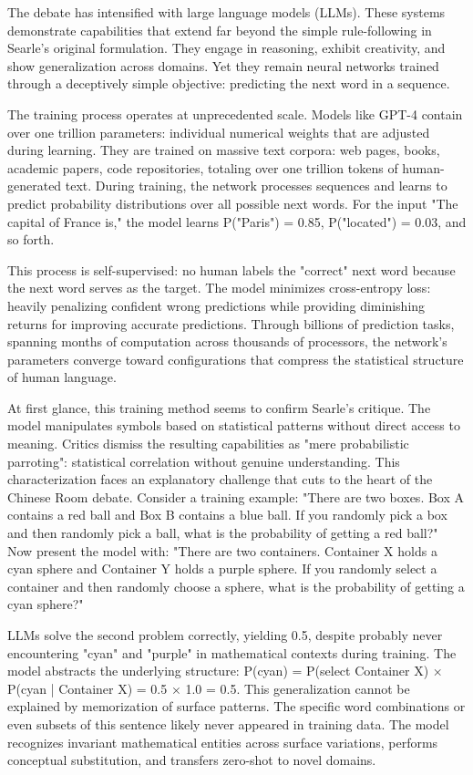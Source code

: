 The debate has intensified with large language models (LLMs). These systems demonstrate capabilities that extend far beyond the simple rule-following in Searle's original formulation. They engage in reasoning, exhibit creativity, and show generalization across domains. Yet they remain neural networks trained through a deceptively simple objective: predicting the next word in a sequence.

The training process operates at unprecedented scale. Models like GPT-4 contain over one trillion parameters: individual numerical weights that are adjusted during learning. They are trained on massive text corpora: web pages, books, academic papers, code repositories, totaling over one trillion tokens of human-generated text. During training, the network processes sequences and learns to predict probability distributions over all possible next words. For the input "The capital of France is," the model learns P("Paris") = 0.85, P("located") = 0.03, and so forth.

This process is self-supervised: no human labels the "correct" next word because the next word serves as the target. The model minimizes cross-entropy loss: heavily penalizing confident wrong predictions while providing diminishing returns for improving accurate predictions. Through billions of prediction tasks, spanning months of computation across thousands of processors, the network's parameters converge toward configurations that compress the statistical structure of human language.

At first glance, this training method seems to confirm Searle's critique. The model manipulates symbols based on statistical patterns without direct access to meaning. Critics dismiss the resulting capabilities as "mere probabilistic parroting": statistical correlation without genuine understanding. This characterization faces an explanatory challenge that cuts to the heart of the Chinese Room debate. Consider a training example: "There are two boxes. Box A contains a red ball and Box B contains a blue ball. If you randomly pick a box and then randomly pick a ball, what is the probability of getting a red ball?" Now present the model with: "There are two containers. Container X holds a cyan sphere and Container Y holds a purple sphere. If you randomly select a container and then randomly choose a sphere, what is the probability of getting a cyan sphere?"

LLMs solve the second problem correctly, yielding 0.5, despite probably never encountering "cyan" and "purple" in mathematical contexts during training. The model abstracts the underlying structure: P(cyan) = P(select Container X) × P(cyan | Container X) = 0.5 × 1.0 = 0.5. This generalization cannot be explained by memorization of surface patterns. The specific word combinations or even subsets of this sentence likely never appeared in training data. The model recognizes invariant mathematical entities across surface variations, performs conceptual substitution, and transfers zero-shot to novel domains.

